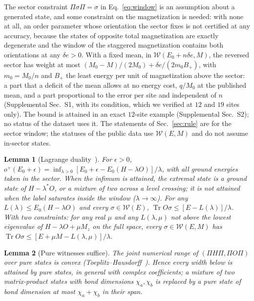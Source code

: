 \documentclass[aps,prx,twocolumn,10pt,superscriptaddress,nofootinbib,longbibliography,floatfix]{revtex4-2}
\newtheorem{lemma}{Lemma}
\theoremstyle{remark}
\newcommand{\de}{\delta e}
\newcommand{\W}{\mathcal{W}}
\newcommand{\Tr}{\operatorname{Tr}}
\begin{document}
The sector constraint $\Pi\sigma\Pi=\sigma$ in Eq.~\eqref{eq:window} is an assumption about a generated state, and
some constraint on the magnetization is needed: with none at all, an order parameter whose orientation the sector
fixes is not certified at any accuracy, because the states of opposite total magnetization are exactly degenerate
and the window of the staggered magnetization contains both orientations at any $\de>0$. With a fixed mean,
in $\W(E_0+n\de,M)$, the reversed sector has weight at most $(M_0-M)/(2M_0)+\de/(2m_0B_+)$, with
$m_0=M_0/n$ and $B_+$ the least energy per unit of magnetization above the sector: a part that a deficit of the
mean allows at no energy cost, $q/M_0$ at the published mean, and a part proportional to the error per site and
independent of $n$ (Supplemental Sec.~S1, with its condition, which we verified at $12$ and $19$ sites only). The bound is %
attained in an exact $12$-site example (Supplemental Sec.~S2); no status of the dataset uses it. %
The statements of Sec.~\ref{sec:rule} are for the
sector window; the statuses of the public data use $\W(E,M)$ and do not assume in-sector states.

\begin{lemma}[Lagrange duality~\cite{cohen1971,manchanda2026}]
\label{lem:dual}
For $\epsilon>0$, $o^+(E_0+\epsilon)=\inf_{\lambda>0}[E_0+\epsilon-E_0(H-\lambda O)]/\lambda$, with all ground
energies taken in the sector. When the infimum is attained, the extremal state is a ground state of $H-\lambda^*O$,
or a mixture of two across a level crossing; it is not attained when the label saturates inside the window
($\lambda\to\infty$). For any $L(\lambda)\le E_0(H-\lambda O)$ and every $\sigma\in\W(E)$,
$\Tr O\sigma\le[E-L(\lambda)]/\lambda$. With two constraints: for any real $\mu$ and any $L(\lambda,\mu)$ not above
the lowest eigenvalue of $H-\lambda O+\mu M_z$ on the full space, every $\sigma\in\W(E,M)$ has
$\Tr O\sigma\le[E+\mu M-L(\lambda,\mu)]/\lambda$.
\end{lemma}

\begin{lemma}[Pure witnesses suffice]
\label{lem:pure}
The joint numerical range of $(\Pi H\Pi,\Pi O\Pi)$ over pure states is convex (Toeplitz--Hausdorff~\cite{toeplitz1918,hausdorff1919}).
Hence every width below is attained by pure states, in general with complex coefficients; a mixture of two
matrix-product states with bond dimensions $\chi_a,\chi_b$ is replaced by a pure state of bond dimension at most
$\chi_a+\chi_b$ in their span.
\end{lemma}
\end{document}
